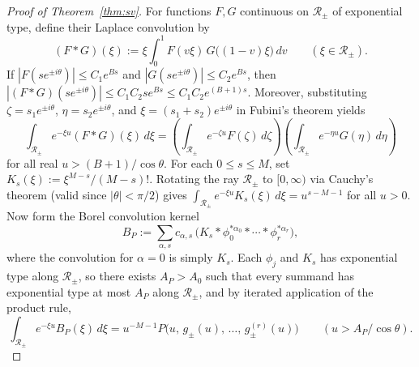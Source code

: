 \documentclass[10pt,reqno]{amsart}
\numberwithin{equation}{section}
\theoremstyle{definition}
\newcommand{\cR}{\mathcal{R}}
\begin{document}
\begin{proof}[Proof of Theorem~\ref{thm:sv}]
For functions $F, G$ continuous on $\cR_\pm$ of exponential type, define their Laplace convolution by
\[
  (F * G)(\xi) := \xi \int_0^1 F(v\xi)\, G\bigl((1-v)\xi\bigr)\,dv \qquad (\xi \in \cR_\pm).
\]
If $|F(s e^{\pm i\theta})| \le C_1 e^{B s}$ and $|G(s e^{\pm i\theta})| \le C_2 e^{B s}$, then $|(F * G)(s e^{\pm i\theta})| \le C_1 C_2 s e^{B s} \le C_1 C_2 e^{(B+1)s}$. Moreover, substituting $\zeta = s_1 e^{\pm i\theta}$, $\eta = s_2 e^{\pm i\theta}$, and $\xi = (s_1 + s_2)e^{\pm i\theta}$ in Fubini's theorem yields
\[
  \int_{\cR_\pm} e^{-\xi u} (F * G)(\xi)\,d\xi
  = \left(\int_{\cR_\pm} e^{-\zeta u} F(\zeta)\,d\zeta\right)\left(\int_{\cR_\pm} e^{-\eta u} G(\eta)\,d\eta\right)
\]
for all real $u > (B + 1)/\cos\theta$. For each $0 \le s \le M$, set $K_s(\xi) := \xi^{M-s}/(M-s)!$. Rotating the ray $\cR_\pm$ to $[0,\infty)$ via Cauchy's theorem (valid since $|\theta| < \pi/2$) gives $\int_{\cR_\pm} e^{-\xi u} K_s(\xi)\,d\xi = u^{s - M - 1}$ for all $u > 0$. Now form the Borel convolution kernel
\[
  B_P := \sum_{\alpha, s} c_{\alpha, s}\, \bigl(K_s * \phi_0^{*\alpha_0} * \cdots * \phi_r^{*\alpha_r}\bigr),
\]
where the convolution for $\alpha = 0$ is simply $K_s$. Each $\phi_j$ and $K_s$ has exponential type along $\cR_\pm$, so there exists $A_P > A_0$ such that every summand has exponential type at most $A_P$ along $\cR_\pm$, and by iterated application of the product rule,
\begin{equation}\label{eq:BP-laplace}
  \int_{\cR_\pm} e^{-\xi u} B_P(\xi)\,d\xi = u^{-M-1} P\bigl(u,\, g_\pm(u),\, \dots,\, g_\pm^{(r)}(u)\bigr)
  \qquad (u > A_P/\cos\theta).
\end{equation}


\end{proof}
\end{document}
